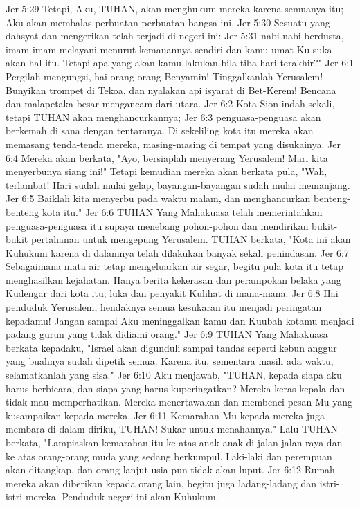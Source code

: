 Jer 5:29  Tetapi, Aku, TUHAN, akan menghukum mereka karena semuanya itu; Aku akan membalas perbuatan-perbuatan bangsa ini.
Jer 5:30  Sesuatu yang dahsyat dan mengerikan telah terjadi di negeri ini:
Jer 5:31  nabi-nabi berdusta, imam-imam melayani menurut kemauannya sendiri dan kamu umat-Ku suka akan hal itu. Tetapi apa yang akan kamu lakukan bila tiba hari terakhir?"
Jer 6:1  Pergilah mengungsi, hai orang-orang Benyamin! Tinggalkanlah Yerusalem! Bunyikan trompet di Tekoa, dan nyalakan api isyarat di Bet-Kerem! Bencana dan malapetaka besar mengancam dari utara.
Jer 6:2  Kota Sion indah sekali, tetapi TUHAN akan menghancurkannya;
Jer 6:3  penguasa-penguasa akan berkemah di sana dengan tentaranya. Di sekeliling kota itu mereka akan memasang tenda-tenda mereka, masing-masing di tempat yang disukainya.
Jer 6:4  Mereka akan berkata, "Ayo, bersiaplah menyerang Yerusalem! Mari kita menyerbunya siang ini!" Tetapi kemudian mereka akan berkata pula, "Wah, terlambat! Hari sudah mulai gelap, bayangan-bayangan sudah mulai memanjang.
Jer 6:5  Baiklah kita menyerbu pada waktu malam, dan menghancurkan benteng-benteng kota itu."
Jer 6:6  TUHAN Yang Mahakuasa telah memerintahkan penguasa-penguasa itu supaya menebang pohon-pohon dan mendirikan bukit-bukit pertahanan untuk mengepung Yerusalem. TUHAN berkata, "Kota ini akan Kuhukum karena di dalamnya telah dilakukan banyak sekali penindasan.
Jer 6:7  Sebagaimana mata air tetap mengeluarkan air segar, begitu pula kota itu tetap menghasilkan kejahatan. Hanya berita kekerasan dan perampokan belaka yang Kudengar dari kota itu; luka dan penyakit Kulihat di mana-mana.
Jer 6:8  Hai penduduk Yerusalem, hendaknya semua kesukaran itu menjadi peringatan kepadamu! Jangan sampai Aku meninggalkan kamu dan Kuubah kotamu menjadi padang gurun yang tidak didiami orang."
Jer 6:9  TUHAN Yang Mahakuasa berkata kepadaku, "Israel akan digunduli sampai tandas seperti kebun anggur yang buahnya sudah dipetik semua. Karena itu, sementara masih ada waktu, selamatkanlah yang sisa."
Jer 6:10  Aku menjawab, "TUHAN, kepada siapa aku harus berbicara, dan siapa yang harus kuperingatkan? Mereka keras kepala dan tidak mau memperhatikan. Mereka menertawakan dan membenci pesan-Mu yang kusampaikan kepada mereka.
Jer 6:11  Kemarahan-Mu kepada mereka juga membara di dalam diriku, TUHAN! Sukar untuk menahannya." Lalu TUHAN berkata, "Lampiaskan kemarahan itu ke atas anak-anak di jalan-jalan raya dan ke atas orang-orang muda yang sedang berkumpul. Laki-laki dan perempuan akan ditangkap, dan orang lanjut usia pun tidak akan luput.
Jer 6:12  Rumah mereka akan diberikan kepada orang lain, begitu juga ladang-ladang dan istri-istri mereka. Penduduk negeri ini akan Kuhukum.
